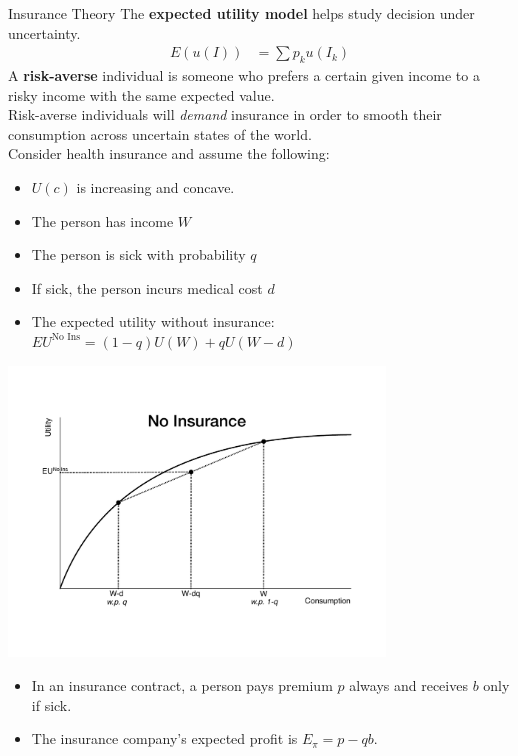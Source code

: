 \documentclass[10pt]{extarticle}
\begin{document}
  \begin{problem}{Insurance Theory}
    The \textbf{expected utility model} helps study decision under uncertainty.
    \begin{align*}
      E(u(I)) &= \sum p_k u(I_k)
    \end{align*}
    A \textbf{risk-averse} individual is someone who prefers a certain given income to a risky income with the same expected value.\\

    Risk-averse individuals will \textit{demand} insurance in order to smooth their consumption across uncertain states of the world.\\

    Consider health insurance and assume the following:
    \begin{itemize}
      \item $U(c)$ is increasing and concave.
      \item The person has income $W$
      \item The person is sick with probability $q$
      \item If sick, the person incurs medical cost $d$
      \item The expected utility without insurance: $EU^{\text{No Ins}} = (1-q)U(W) + qU(W-d)$
    \end{itemize}
    \begin{center}
      \includegraphics[width=10cm]{images/no_insurance_expected_utility.pdf}
    \end{center}
    \begin{itemize}
      \item In an insurance contract, a person pays premium $p$ always and receives $b$ only if sick.
      \item The insurance company's expected profit is $E_{\pi} = p - qb$.

\end{itemize}
\end{problem}
\end{document}
